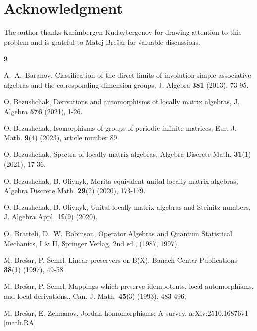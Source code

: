\documentclass[12pt]{amsart}
\begin{document}
{	
		
		
		
		
		
		
		
		\section*{Acknowledgment}
		
		
				\medskip
		
The author thanks Karimbergen Kudaybergenov for drawing attention to this problem and is grateful to Matej Bre\v{s}ar for valuable discussions.
	
		\begin{thebibliography}{9}
			

 A.~A.~Baranov,  Classification of the direct limits of involution simple associative algebras and the corresponding dimension groups, J. Algebra \textbf{381} (2013), 73-95.

			
			 O. Bezushchak, Derivations and automorphisms of locally matrix algebras, J. Algebra  \textbf{576} (2021), 1-26. 
			
			
		 O. Bezushchak,		Isomorphisms of groups of periodic infinite matrices, Eur. J. Math. \textbf{9}(4) (2023), article number 89. 
			
 O. Bezushchak, Spectra of locally matrix algebras, Algebra Discrete Math. \textbf{31}(1) (2021), 17-36.

 O. Bezushchak, B. Oliynyk, 			Morita equivalent unital locally matrix algebras, Algebra Discrete Math. \textbf{29}(2) (2020), 173-179.

			
			 O. Bezushchak, B. Oliynyk, Unital locally matrix algebras  and Steinitz numbers,  J. Algebra Appl. \textbf{19}(9) (2020). 
			
					O.~Bratteli, D.~W.~Robinson, Operator Algebras and Quantum Statistical Mechanics, I \& II,			Springer Verlag, 2nd ed., (1987, 1997).
			
		 		M. Brešar, P. Šemrl, Linear preservers on B(X),  Banach Center Publications \textbf{38}(1) (1997), 49-58.
		
		
		 		M. Brešar, P. Šemrl,		Mappings which preserve idempotents, local automorphisms, and local derivations.,	Can. J. Math. \textbf{45}(3) (1993), 483-496.
		
		
		
			 M. Bre\v{s}ar, E. Zelmanov, Jordan homomorphisms: A survey,	arXiv:2510.16876v1 [math.RA]
			

\end{thebibliography}}
\end{document}
